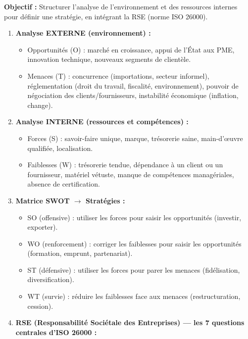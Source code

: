 \documentclass[11pt]{article}
\newcommand{\cle}[1]{{\popxbold\color{popdark}#1}}
\begin{document}
\begin{methode}
    \textbf{Objectif :} Structurer l'analyse de l'environnement et des ressources internes pour définir une stratégie, en intégrant la RSE (norme ISO 26000).
    \begin{enumerate}
        \item \textbf{Analyse EXTERNE (environnement) :}
              \begin{itemize}
                  \item \cle{Opportunités (O)} : marché en croissance, appui de l'État aux PME, innovation technique, nouveaux segments de clientèle.
                  \item \cle{Menaces (T)} : concurrence (importations, secteur informel), réglementation (droit du travail, fiscalité, environnement), pouvoir de négociation des clients/fournisseurs, instabilité économique (inflation, change).
              \end{itemize}
        \item \textbf{Analyse INTERNE (ressources et compétences) :}
              \begin{itemize}
                  \item \cle{Forces (S)} : savoir-faire unique, marque, trésorerie saine, main-d'œuvre qualifiée, localisation.
                  \item \cle{Faiblesses (W)} : trésorerie tendue, dépendance à un client ou un fournisseur, matériel vétuste, manque de compétences managériales, absence de certification.
              \end{itemize}
        \item \textbf{Matrice SWOT $\rightarrow$ Stratégies :}
              \begin{itemize}
                  \item \cle{SO (offensive)} : utiliser les forces pour saisir les opportunités (investir, exporter).
                  \item \cle{WO (renforcement)} : corriger les faiblesses pour saisir les opportunités (formation, emprunt, partenariat).
                  \item \cle{ST (défensive)} : utiliser les forces pour parer les menaces (fidélisation, diversification).
                  \item \cle{WT (survie)} : réduire les faiblesses face aux menaces (restructuration, cession).
              \end{itemize}
        \item \textbf{RSE (Responsabilité Sociétale des Entreprises) — les 7 questions centrales d'ISO 26000 :}

\end{enumerate}
\end{methode}
\end{document}
